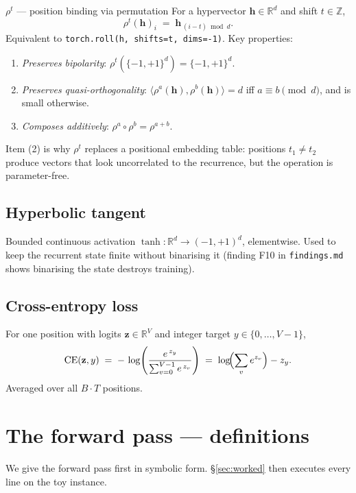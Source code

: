 \documentclass[11pt,a4paper]{article}
\newcommand{\bh}{\mathbf{h}}
\newcommand{\bz}{\mathbf{z}}
\newcommand{\bipset}{\{-1,+1\}}
\begin{document}
\begin{notation}{$\rho^{t}$ --- position binding via permutation}
For a hypervector $\bh \in \mathbb{R}^{d}$ and shift $t\in\mathbb{Z}$,
\[
\rho^{t}(\bh)_i \;=\; \bh_{\,(i - t)\bmod d}.
\]
Equivalent to \texttt{torch.roll(h, shifts=t, dims=-1)}. Key properties:
\begin{enumerate}[leftmargin=18pt,itemsep=2pt]
  \item \emph{Preserves bipolarity}: $\rho^{t}(\bipset^{d}) = \bipset^{d}$.
  \item \emph{Preserves quasi-orthogonality}: $\langle \rho^{a}(\bh),\rho^{b}(\bh)\rangle = d$ iff $a\equiv b\pmod d$,
        and is small otherwise.
  \item \emph{Composes additively}: $\rho^{a}\circ\rho^{b} = \rho^{a+b}$.
\end{enumerate}
Item (2) is why $\rho^{t}$ replaces a positional embedding table: positions
$t_1\ne t_2$ produce vectors that look uncorrelated to the recurrence, but the
operation is parameter-free.
\end{notation}

\subsection{Hyperbolic tangent}

Bounded continuous activation $\tanh: \mathbb{R}^{d} \to (-1,+1)^{d}$,
elementwise. Used to keep the recurrent state finite without binarising it
(finding F10 in \texttt{findings.md} shows binarising the state destroys
training).

\subsection{Cross-entropy loss}

For one position with logits $\bz \in \mathbb{R}^{V}$ and integer target
$y \in \{0,\dots,V{-}1\}$,
\[
\mathrm{CE}(\bz, y) \;=\; -\,\log\!\left(\frac{e^{\,z_y}}{\sum_{v=0}^{V-1} e^{\,z_v}}\right)
                       \;=\; \log\!\Bigl(\sum_v e^{z_v}\Bigr) - z_y.
\]
Averaged over all $B\cdot T$ positions.

\section{The forward pass --- definitions}

We give the forward pass first in symbolic form. \S\ref{sec:worked} then
executes every line on the toy instance.
\end{document}
